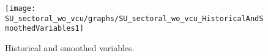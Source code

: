  
\begin{figure}[H]
\centering 
\texttt{[image: SU\_sectoral\_wo\_vcu/graphs/SU\_sectoral\_wo\_vcu\_HistoricalAndSmoothedVariables1]}
\caption{Historical and smoothed variables.}\label{Fig:HistoricalAndSmoothedVariables:1}
\end{figure}


